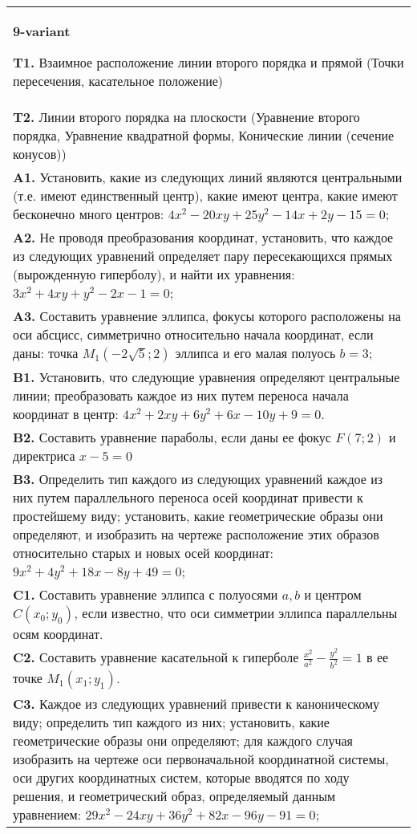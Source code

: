 \documentclass{article}
\begin{document}
\begin{tabular}{m{17cm}}
\textbf{9-variant}
\newline

\textbf{T1.} Взаимное расположение линии второго порядка и прямой (Точки пересечения, касательное положение) \\
\textbf{T2.} Линии второго порядка на плоскости (Уравнение второго порядка, Уравнение квадратной формы, Конические линии (сечение конусов)) \\
\textbf{A1.} Установить, какие из следующих линий являются центральными (т.е. имеют единственный центр), какие имеют центра, какие имеют бесконечно много центров: $4 x^2-20 x y+25 y^2-14 x+2 y-15=0$; \\
\textbf{A2.} Не проводя преобразования координат, установить, что каждое из следующих уравнений определяет пару пересекающихся прямых (вырожденную гиперболу), и найти их уравнения: $3 x^2+4 x y+y^2-2 x-1=0$; \\
\textbf{A3.} Составить уравнение эллипса, фокусы которого расположены на оси абсцисс, симметрично относительно начала координат, если даны: точка $M_1(-2 \sqrt{5} ; 2)$ эллипса и его малая полуось $b=3$; \\
\textbf{B1.} Установить, что следующие уравнения определяют центральные линии; преобразовать каждое из них путем переноса начала координат в центр: $4 x^2+2 x y+6 y^2+6 x-10 y+9=0$. \\
\textbf{B2.} Составить уравнение параболы, если даны ее фокус $F(7 ; 2)$ и директриса $x-5=0$ \\
\textbf{B3.} Определить тип каждого из следующих уравнений каждое из них путем параллельного переноса осей координат привести к простейшему виду; установить, какие геометрические образы они определяют, и изобразить на чертеже расположение этих образов относительно старых и новых осей координат: $9 x^2+4 y^2+18 x-8 y+49=0$; \\
\textbf{C1.} Составить уравнение эллипса с полуосями $a, b$ и центром $C\left(x_0 ; y_0\right)$, если известно, что оси симметрии эллипса параллельны осям координат. \\
\textbf{C2.} Составить уравнение касательной к гиперболе $\frac{x^2}{a^2}-\frac{y^2}{b^2}=1$ в ее точке $M_1\left(x_1 ; y_1\right)$. \\
\textbf{C3.} Каждое из следующих уравнений привести к каноническому виду; определить тип каждого из них; установить, какие геометрические образы они определяют; для каждого случая изобразить на чертеже оси первоначальной координатной системы, оси других координатных систем, которые вводятся по ходу решения, и геометрический образ, определяемый данным уравнением: $29 x^2-24 x y+36 y^2+82 x-96 y-91=0$; \\

\end{tabular}
\vspace{1cm}
\end{document}

